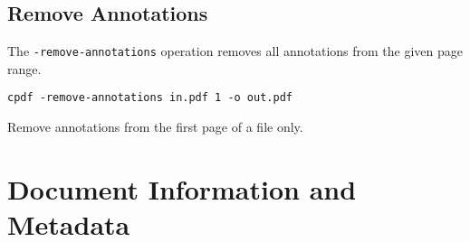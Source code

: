 \documentclass{book}
\begin{document}
  \section{Remove Annotations}
  The \texttt{-remove-annotations} operation removes all annotations from the
given page range.

  \begin{framed}
    \small\verb!cpdf -remove-annotations in.pdf 1 -o out.pdf!
    
    \vspace{2.5mm}
    \noindent Remove annotations from the first page of a file only.
  \end{framed}
\chapter{Document Information and Metadata}
\end{document}
